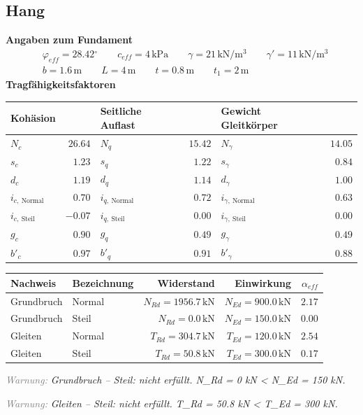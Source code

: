 \documentclass[11pt,a4paper]{article}
\newcommand{\hinweis}[2]{\par\noindent\textcolor{gray}{\textit{#1:}} \textit{#2}\par}
\begin{document}
\subsection{Hang}
\noindent\textbf{Angaben zum Fundament}
\begin{equation*}
\begin{aligned} & \varphi_{eff} = 28.42{}^{\circ} \qquad c_{eff} = 4\,\mathrm{kPa} \qquad \gamma = 21\,\mathrm{kN}/\mathrm{m}^{3} \qquad \gamma' = 11\,\mathrm{kN}/\mathrm{m}^{3} \\ & b = 1.6\,\mathrm{m} \qquad L = 4\,\mathrm{m} \qquad t = 0.8\,\mathrm{m} \qquad t_1 = 2\,\mathrm{m} \end{aligned}
\end{equation*}
\noindent\textbf{Tragfähigkeitsfaktoren}
\begin{longtable}{lrlrlr}
\hline
Kohäsion &  & Seitliche Auflast &  & Gewicht Gleitkörper &  \\
\hline
\endhead
$N_{c}$ & $26.64$ & $N_{q}$ & $15.42$ & $N_{\gamma}$ & $14.05$ \\
$s_{c}$ & $1.23$ & $s_{q}$ & $1.22$ & $s_{\gamma}$ & $0.84$ \\
$d_{c}$ & $1.19$ & $d_{q}$ & $1.14$ & $d_{\gamma}$ & $1.00$ \\
$i_{c,\ \text{Normal}}$ & $0.70$ & $i_{q,\ \text{Normal}}$ & $0.72$ & $i_{\gamma,\ \text{Normal}}$ & $0.63$ \\
$i_{c,\ \text{Steil}}$ & $-0.07$ & $i_{q,\ \text{Steil}}$ & $0.00$ & $i_{\gamma,\ \text{Steil}}$ & $0.00$ \\
$g_{c}$ & $0.90$ & $g_{q}$ & $0.49$ & $g_{\gamma}$ & $0.49$ \\
$b'_{c}$ & $0.97$ & $b'_{q}$ & $0.91$ & $b'_{\gamma}$ & $0.88$ \\
\hline
\end{longtable}
\begin{xltabular}{\linewidth}{>{\raggedright\arraybackslash}X>{\raggedright\arraybackslash}Xrrr}
\hline
Nachweis & Bezeichnung & Widerstand & Einwirkung & $\alpha_{eff}$ \\
\hline
\endhead
Grundbruch & Normal & $N_{Rd} = 1956.7\,\mathrm{kN}$ & $N_{Ed} = 900.0\,\mathrm{kN}$ & $2.17$ \\
Grundbruch & Steil & $N_{Rd} = 0.0\,\mathrm{kN}$ & $N_{Ed} = 150.0\,\mathrm{kN}$ & $0.00$ \\
Gleiten & Normal & $T_{Rd} = 304.7\,\mathrm{kN}$ & $T_{Ed} = 120.0\,\mathrm{kN}$ & $2.54$ \\
Gleiten & Steil & $T_{Rd} = 50.8\,\mathrm{kN}$ & $T_{Ed} = 300.0\,\mathrm{kN}$ & $0.17$ \\
\hline
\end{xltabular}
\hinweis{Warnung}{Grundbruch – Steil: nicht erfüllt. N\_Rd = 0 kN < N\_Ed = 150 kN.}
\hinweis{Warnung}{Gleiten – Steil: nicht erfüllt. T\_Rd = 50.8 kN < T\_Ed = 300 kN.}
\end{document}
